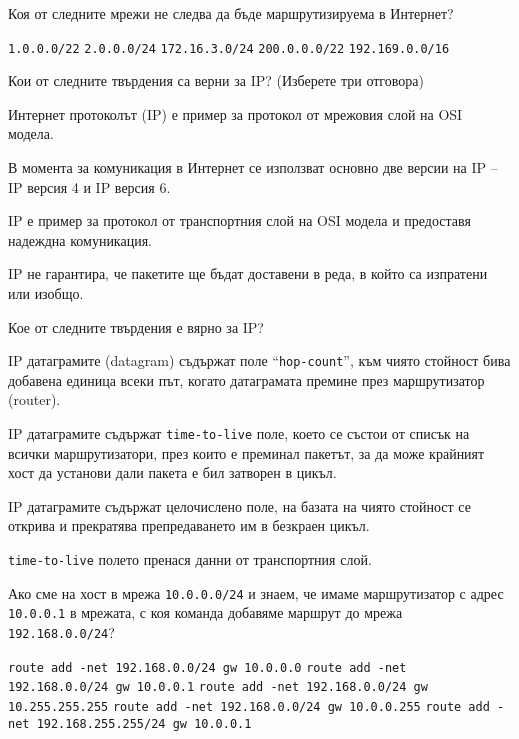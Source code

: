 \begin{questions}
  \question[6] Коя от следните мрежи не следва да бъде маршрутизируема в Интернет?
  \begin{choices}
    \choice \texttt{1.0.0.0/22}
    \choice \texttt{2.0.0.0/24}
    \CorrectChoice \texttt{172.16.3.0/24}
    \choice \texttt{200.0.0.0/22}
    \choice \texttt{192.169.0.0/16}
  \end{choices}

  \question[6] Кои от следните твърдения са верни за IP? (Изберете три отговора)
  \begin{choices}
    \CorrectChoice Интернет протоколът (IP) е пример за протокол от мрежовия
    слой на OSI модела.

    \CorrectChoice В момента за комуникация в Интернет се използват основно две
    версии на IP – IP версия 4 и IP версия 6.

    \choice IP е пример за протокол от транспортния слой на OSI модела и
    предоставя надеждна комуникация.

    \CorrectChoice IP не гарантира, че пакетите ще бъдат доставени в реда, в
    който са изпратени или изобщо.
  \end{choices}

  \question[6] Кое от следните твърдения е вярно за IP?
  \begin{choices}
    \choice IP датаграмите (\foreignlanguage{english}{datagram}) съдържат поле
    "`\texttt{\foreignlanguage{english}{hop-count}}"', към чиято стойност бива
    добавена единица всеки път, когато датаграмата премине през маршрутизатор
    (\foreignlanguage{english}{router}).

    \choice IP датаграмите съдържат
    \texttt{\foreignlanguage{english}{time-to-live}} поле, което се състои от
    списък на всички маршрутизатори, през които е преминал пакетът, за да може
    крайният хост да установи дали пакета е бил затворен в цикъл.

    \CorrectChoice IP датаграмите съдържат целочислено поле, на базата на чиято
    стойност се открива и прекратява препредаването им в безкраен цикъл.

    \choice \texttt{\foreignlanguage{english}{time-to-live}} полето пренася
    данни от транспортния слой.
  \end{choices}
  \question[6] Ако сме на хост в мрежа \texttt{10.0.0.0/24} и знаем, че имаме
  маршрутизатор с адрес \texttt{10.0.0.1} в мрежата, с коя команда добавяме
  маршрут до мрежа \texttt{192.168.0.0/24}?
  \begin{choices}
    \choice \texttt{route add -net 192.168.0.0/24 gw 10.0.0.0}
    \CorrectChoice \texttt{route add -net 192.168.0.0/24 gw 10.0.0.1}
    \choice \texttt{route add -net 192.168.0.0/24 gw 10.255.255.255}
    \choice \texttt{route add -net 192.168.0.0/24 gw 10.0.0.255}
    \choice \texttt{route add -net 192.168.255.255/24 gw 10.0.0.1}
  \end{choices}



\end{questions}
